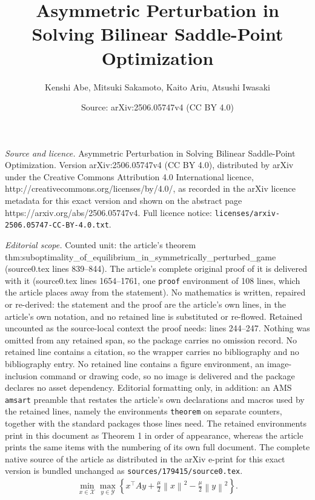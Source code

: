 \documentclass[10pt,a4paper]{amsart}
\title{Asymmetric Perturbation in Solving Bilinear Saddle-Point Optimization}
\author{Kenshi Abe, Mitsuki Sakamoto, Kaito Ariu, Atsushi Iwasaki}
\date{Source: arXiv:2506.05747v4 (CC BY 4.0)}
\newcommand{\X}{\mathcal{X}}
\newcommand{\Y}{\mathcal{Y}}
\begin{document}
\maketitle

\noindent\emph{Source and licence.} Asymmetric Perturbation in Solving Bilinear Saddle-Point Optimization. Version arXiv:2506.05747v4 (CC BY 4.0), distributed by arXiv under the Creative Commons Attribution 4.0 International licence, http://creativecommons.org/licenses/by/4.0/, as recorded in the arXiv licence metadata for this exact version and shown on the abstract page https://arxiv.org/abs/2506.05747v4. Full licence notice: \texttt{licenses/arxiv-2506.05747-CC-BY-4.0.txt}.\par\smallskip

\noindent\textit{Editorial scope.} Counted unit: the article's theorem thm:suboptimality\_of\_equilibrium\_in\_symmetrically\_perturbed\_game (source0.tex lines 839--844). The article's complete original proof of it is delivered with it (source0.tex lines 1654--1761, one \texttt{proof} environment of 108 lines, which the article places away from the statement). No mathematics is written, repaired or re-derived: the statement and the proof are the article's own lines, in the article's own notation, and no retained line is substituted or re-flowed.  Retained uncounted as the source-local context the proof needs: lines 244--247.  Nothing was omitted from any retained span, so the package carries no omission record.  No retained line contains a citation, so the wrapper carries no bibliography and no bibliography entry.  No retained line contains a figure environment, an image-inclusion command or drawing code, so no image is delivered and the package declares no asset dependency.  Editorial formatting only, in addition: an AMS \texttt{amsart} preamble that restates the article's own declarations and macros used by the retained lines, namely the environments \texttt{theorem} on separate counters, together with the standard packages those lines need.  The retained environments print in this document as Theorem 1 in order of appearance, whereas the article prints the same items with the numbering of its own full document.  The complete native source of the article as distributed in the arXiv e-print for this exact version is bundled unchanged as \texttt{sources/179415/source0.tex}.
\begin{align}
    \min_{x\in \X}\max_{y\in \Y} \left\{x^{\top}Ay + \frac{\mu}{2}\left\|x\right\|^2 - \frac{\mu}{2}\left\|y\right\|^2\right\}.
    \label{eq:symmetric_perturbed_minimax_optimization}
\end{align}
\end{document}
